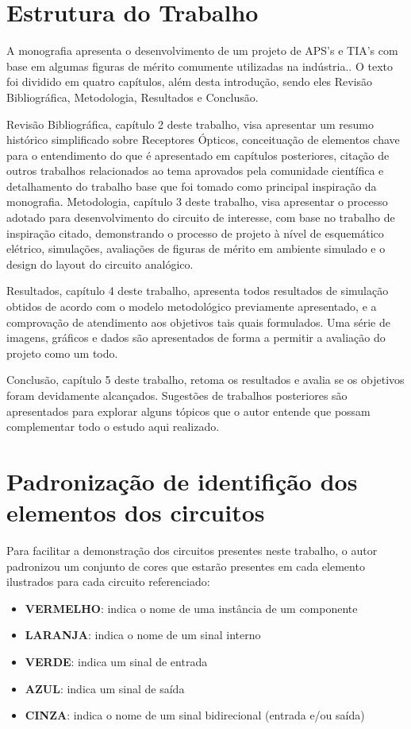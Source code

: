 \section{Estrutura do Trabalho}

A monografia apresenta o desenvolvimento de um projeto de APS's e TIA's com base em algumas figuras de mérito comumente utilizadas na indústria.. O texto foi dividido em quatro capítulos, além desta introdução, sendo eles Revisão Bibliográfica, Metodologia, Resultados e Conclusão.

Revisão Bibliográfica, capítulo 2 deste trabalho, visa apresentar um resumo histórico simplificado sobre Receptores Ópticos, conceituação de elementos chave para o entendimento do que é apresentado em capítulos posteriores, citação de outros trabalhos relacionados ao tema aprovados pela comunidade científica e detalhamento do trabalho base que foi tomado como principal inspiração da monografia.
Metodologia, capítulo 3 deste trabalho, visa apresentar o processo adotado para desenvolvimento do circuito de interesse, com base no trabalho de inspiração citado, demonstrando o processo de projeto à nível de esquemático elétrico, simulações, avaliações de figuras de mérito em ambiente simulado e o design do layout do circuito analógico.

Resultados, capítulo 4 deste trabalho, apresenta todos resultados de simulação obtidos de acordo com o modelo metodológico previamente apresentado, e a comprovação de atendimento aos objetivos tais quais formulados. Uma série de imagens, gráficos e dados são apresentados de forma a permitir a avaliação do projeto como um todo.

Conclusão, capítulo 5 deste trabalho, retoma os resultados e avalia se os objetivos foram devidamente alcançados. Sugestões de trabalhos posteriores são apresentados para explorar alguns tópicos que o autor entende que possam complementar todo o estudo aqui realizado.

\section{Padroniza{\c c}\~ao de identifi{\c c}\~ao dos elementos dos circuitos}
\label{section:padrao_sinais}

Para facilitar a demonstra{\c c}\~ao dos circuitos presentes neste trabalho, o autor padronizou um conjunto de cores que estar\~ao presentes em cada elemento ilustrados para cada circuito referenciado:

\begin{itemize}
    \item \textbf{\color{red}VERMELHO}: indica o nome de uma inst\^ancia de um componente
    \item \textbf{\color{orange}LARANJA}: indica o nome de um sinal interno
    \item \textbf{\color{green}VERDE}: indica um sinal de entrada
    \item \textbf{\color{blue}AZUL}: indica um sinal de sa\'ida
    \item \textbf{\color{gray}CINZA}: indica o nome de um sinal bidirecional (entrada e/ou sa\'ida)
\end{itemize}